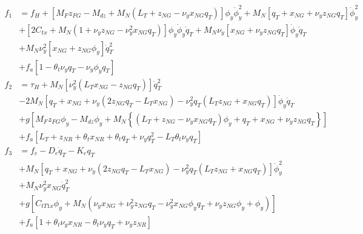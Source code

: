 \documentclass[wes, manuscript]{copernicus}
\begin{document}
\begin{align}
f_1&= f_H +
\left[
 M_{F} z_{FG}
- M_{dz}
+ M_N (L_T + z_{NG} - \nu_y x_{NG} q_T)
\right]
\phi_y
\dot{\phi}_y^2 
+
M_N\left[
q_T
+ x_{NG} 
+ \nu_y z_{NG} q_T 
\right]
\dot{\phi}_y^2 
\\
&
+\left[
2 C_{tx}
+
M_N( 1
    + \nu_y z_{NG} 
    - \nu_y^{2} x_{NG} q_T 
    )
\right] \phi_y \dot{\phi}_y \dot{q}_T
+ M_N\nu_y\left[ x_{NG} + \nu_y z_{NG} q_T\right] \dot{\phi}_y \dot{q}_T
\\
&
+ M_N \nu_y^{2} \left[x_{NG} + z_{NG} \phi_y\right]  \dot{q}_T^{2} 
\\
&+f_a\left[1 - \theta_t \nu_y q_T - \nu_y \phi_y q_T \right] 
\\
f_2&= \tau_H  
+M_N \left[
  \nu_y^2(L_T x_{NG}- z_{NG} q_T) 
  \right]
 \dot{q}_T^{2}
  \\
 & -
  2M_N\left[
 q_T + x_{NG} 
 +\nu_y(2 z_{NG} q_T - L_T x_{NG})
 -\nu_y^2q_T(L_T  z_{NG}+ x_{NG} q_T)
 \right]
  \dot{\phi}_y \dot{q}_T 
\\
&
+g \left[
M_{F} z_{FG} \phi_y 
- M_{dz} \phi_y
+ M_N \left\{
(L_T +  z_{NG} -  \nu_y x_{NG}  q_T )\phi_y
+  q_T +  x_{NG} +  \nu_y z_{NG} q_T 
\right\}
\right]
\\
&+f_a \left[L_T + z_{NR} + \theta_t x_{NR} + \theta_t q_T + \nu_y q_T^{2} - L_T \theta_t \nu_y q_T\right]
\\
f_3&= f_e - D_e\dot{q}_T - K_e q_T 
\\
&
+M_N\left[
q_T 
+ x_{NG} 
+\nu_y( 2 z_{NG} q_T - L_T x_{NG})
-\nu_y^2q_T (L_T z_{NG} + x_{NG} q_T)
\right]
\dot{\phi}_y^2
\\
& 
+ M_N \nu_y^{2} x_{NG} \dot{q}_T^2 
\\
&+ g \left[
C_{t T 1x} \phi_y
+   M_N\left(
   \nu_y x_{NG}
+  \nu_y^{2} z_{NG} q_T  
-  \nu_y^{2} x_{NG} \phi_y q_T 
+ \nu_y z_{NG} \phi_y + \phi_y
\right)
\right]
\\
&+f_a\left[ 1+ \theta_t \nu_y x_{NR} - \theta_t \nu_y q_T + \nu_y z_{NR} \right]
\end{align}












\end{document}
